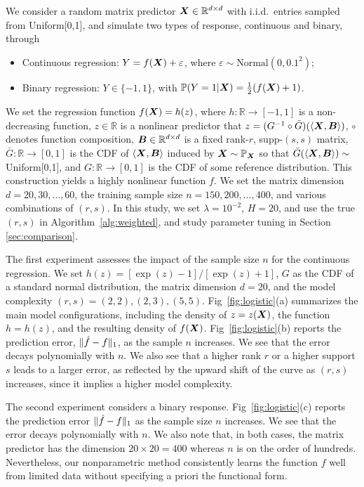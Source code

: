 \documentclass[aos]{imsart}
\theoremstyle{definition}
\begin{document}
We consider a random matrix predictor $\bm X\in\mathbb{R}^{d\times d}$ with i.i.d.\ entries sampled from Uniform[0,1], and simulate two types of response, continuous and binary, through 
\begin{itemize}
\item Continuous regression: $Y=f(\bm X)+\varepsilon$, where $\varepsilon \sim \text{Normal}(0,0.1^2)$;
\item Binary regression: $Y\in\{-1,1\}$, with $\mathbb{P}(Y=1|\bm X)={1\over 2}(f(\bm X)+1)$.
\end{itemize}
We set the regression function $f(\bm X)=h(z)$, where $h\colon \mathbb{R}\to[-1,1]$ is a non-decreasing function, $z\in\mathbb{R}$ is a nonlinear predictor that $z= (G^{-1}\circ \bar G)(\langle \bm X, \bm B \rangle)$, $\circ$ denotes function composition, $\bm B\in\mathbb{R}^{d\times d}$ is a fixed rank-$r$, supp-$(s,s)$ matrix, $\bar G\colon \mathbb{R}\to[0,1]$ is the CDF of $\langle \bm X, \bm B \rangle$ induced by $\bm X\sim \mathbb{P}_{\bm X}$ so that $\bar G(\langle \bm X, \bm B \rangle)\sim$ Uniform[0,1], and $G\colon \mathbb{R}\to[0,1]$ is the CDF of some reference distribution. This construction yields a highly nonlinear function $f$. We set the matrix dimension $d=20,30,\ldots,60$, the training sample size $n=150, 200, \ldots, 400$, and various combinations of $(r,s)$. In this study, we set $\lambda=10^{-2}$, $H=20$, and use the true $(r,s)$ in Algorithm~\ref{alg:weighted}, and study parameter tuning in Section \ref{sec:comparison}. 

The first experiment assesses the impact of the sample size $n$ for the continuous regression. We set $h(z)=[\exp(z)-1] / [\exp(z)+1]$, $G$ as the CDF of a standard normal distribution, the matrix dimension $d=20$, and the model complexity $(r,s)=(2,2),(2,3),(5,5)$. Fig~\ref{fig:logistic}(a) summarizes the main model configurations, including the density of $z=z(\bm X)$, the function $h=h(z)$, and the resulting density of $f(\bm X)$. Fig~\ref{fig:logistic}(b) reports the prediction error, $\lVert\hat f - f\rVert_1$, as the sample $n$ increases. We see that the error decays polynomially with $n$. We also see that a higher rank $r$ or a higher support $s$ leads to a larger error, as reflected by the upward shift of the curve as $(r,s)$ increases, since it implies a higher model  complexity.  

The second experiment considers a binary response. Fig~\ref{fig:logistic}(c) reports the prediction error $\lVert\hat f - f\rVert_1$ as the sample size $n$ increases. We see that the error decays polynomially with $n$. We also note that, in both cases, the matrix predictor has the dimension $20 \times 20=400$ whereas $n$ is on the order of hundreds. Nevertheless, our nonparametric method consistently learns the function $f$ well from limited data without specifying a priori the functional form.
\end{document}
